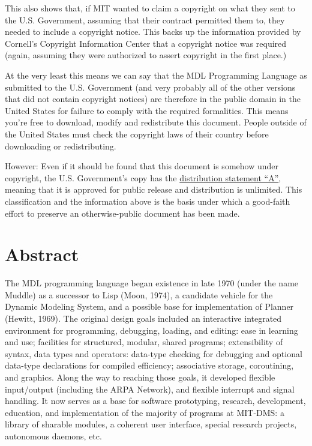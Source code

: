 \documentclass[a4paper,]{article}
\begin{document}
This also shows that, if MIT wanted to claim a copyright on what they sent to the U.S. Government, assuming that their
contract permitted them to, they needed to include a copyright notice. This backs up the information provided by Cornell's
Copyright Information Center that a copyright notice was required (again, assuming they were authorized to assert copyright
in the first place.)

At the very least this means we can say that the MDL Programming Language as submitted to the U.S. Government (and very
probably all of the other versions that did not contain copyright notices) are therefore in the public domain in the United
States for failure to comply with the required formalities. This means you're free to download, modify and redistribute
this document. People outside of the United States must check the copyright laws of their country before downloading or
redistributing.

However: Even if it should be found that this document is somehow under copyright, the U.S. Government's copy has the
\href{http://www.dtic.mil/dtic/submit/distribution_limitations_and_statements.html}{distribution statement ``A''}, meaning
that it is approved for public release and distribution is unlimited. This classification and the information above is the
basis under which a good-faith effort to preserve an otherwise-public document has been made.

\section{Abstract}\label{abstract}

The MDL programming language began existence in late 1970 (under the name Muddle) as a successor to Lisp (Moon, 1974), a
candidate vehicle for the Dynamic Modeling System, and a possible base for implementation of Planner (Hewitt, 1969). The
original design goals included an interactive integrated environment for programming, debugging, loading, and editing: ease
in learning and use; facilities for structured, modular, shared programs; extensibility of syntax, data types and
operators: data-type checking for debugging and optional data-type declarations for compiled efficiency; associative
storage, coroutining, and graphics. Along the way to reaching those goals, it developed flexible input/output (including
the ARPA Network), and flexible interrupt and signal handling. It now serves as a base for software prototyping, research,
development, education, and implementation of the majority of programs at MIT-DMS: a library of sharable modules, a
coherent user interface, special research projects, autonomous daemons, etc.
\end{document}
